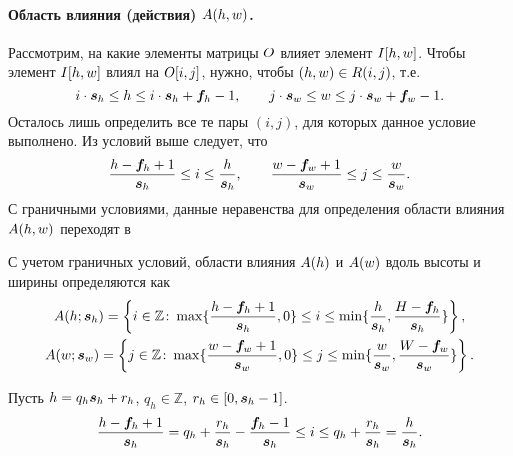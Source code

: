 \documentclass{book}
\numberwithin{theorem}{chapter}
\numberwithin{statement}{chapter}
\numberwithin{lemma}{chapter}
\theoremstyle{definition}
\numberwithin{task}{chapter}
\theoremstyle{remark}
\numberwithin{example}{chapter}
\theoremstyle{definition}
\numberwithin{definition}{chapter}
\theoremstyle{remark}
\theoremstyle{remark}
\numberwithin{lyrics}{section}
\begin{document}
\paragraph{Область влияния (действия) $A(h, w)$.}
Рассмотрим, на какие элементы матрицы $O$ влияет элемент $I[h, w]$. Чтобы элемент $I[h, w]$ влиял на $O[i, j]$, нужно, чтобы $(h, w) \in R(i, j)$, т.е.
\begin{equation}
i \cdot \boldsymbol{s}_h \le h \le i \cdot \boldsymbol{s}_h + \boldsymbol{f}_h - 1, \qquad j \cdot \boldsymbol{s}_w \le w \le j \cdot \boldsymbol{s}_w + \boldsymbol{f}_w - 1.
\end{equation}
Осталось лишь определить все те пары $(i, j)$, для которых данное условие выполнено. 
Из условий выше следует, что
\begin{equation}
\frac{h - \boldsymbol{f}_h + 1}{\boldsymbol{s}_h} \le i \le \frac{h}{\boldsymbol{s}_h}, \qquad \frac{w - \boldsymbol{f}_w + 1}{\boldsymbol{s}_w} \le j \le \frac{w}{\boldsymbol{s}_w}. 
\end{equation}
С граничными условиями, данные неравенства для определения области влияния $A(h, w)$ переходят в

С учетом граничных условий, области влияния $A(h)$ и $A(w)$ вдоль высоты и ширины определяются как
\begin{gather*}
A(h; \boldsymbol{s}_h) = \left\{i \in \mathbb{Z} \colon \max\{\frac{h - \boldsymbol{f}_h + 1}{\boldsymbol{s}_h}, 0\} \le i \le \min\{\frac{h}{\boldsymbol{s}_h}, \frac{H - \boldsymbol{f}_h}{\boldsymbol{s}_h}\}\right\},\\
A(w; \boldsymbol{s}_w) = \left\{j \in \mathbb{Z} \colon \max\{\frac{w - \boldsymbol{f}_w + 1}{\boldsymbol{s}_w}, 0\} \le j \le \min\{\frac{w}{\boldsymbol{s}_w}, \frac{W - \boldsymbol{f}_w}{\boldsymbol{s}_w}\}\right\}.\\
\end{gather*}

Пусть $h = q_h\boldsymbol{s}_h + r_h$, $q_h \in \mathbb{Z}$, $r_h \in [0, \boldsymbol{s}_h - 1]$.
\begin{equation*}
\frac{h - \boldsymbol{f}_h + 1}{\boldsymbol{s}_h} = q_h + \frac{r_h}{\boldsymbol{s}_h} -\frac{\boldsymbol{f}_h - 1}{\boldsymbol{s}_h} \le i \le q_h + \frac{r_h}{\boldsymbol{s}_h} = \frac{h}{\boldsymbol{s}_h}.
\end{equation*}
\end{document}
